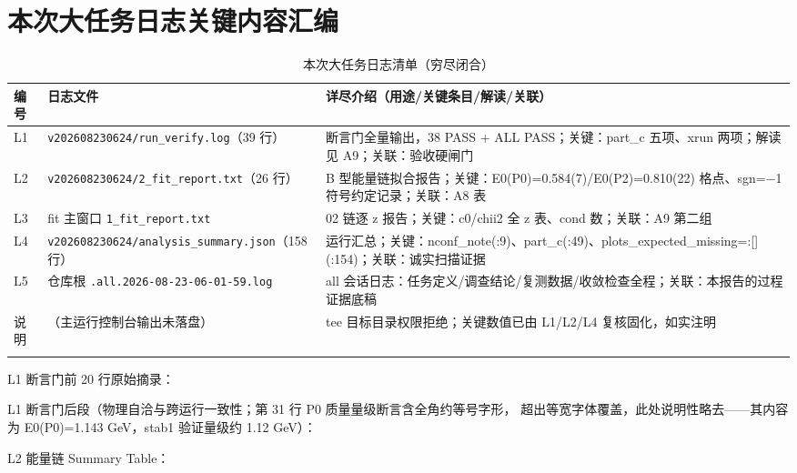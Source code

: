 \documentclass[UTF8]{ctexart}
\begin{document}
\section{本次大任务日志关键内容汇编}

\begin{xltabular}{\textwidth}{llX}
\toprule
编号 & 日志文件 & 详尽介绍（用途/关键条目/解读/关联） \\
\midrule
\endhead
L1 & \texttt{\nolinkurl{v202608230624/run\_verify.log}}（39 行） & 断言门全量输出，38 PASS + ALL PASS；关键：part\_c 五项、xrun 两项；解读见 A9；关联：验收硬闸门 \\
L2 & \texttt{\nolinkurl{v202608230624/2\_fit\_report.txt}}（26 行） & B 型能量链拟合报告；关键：E0(P0)=0.584(7)/E0(P2)=0.810(22) 格点、sgn=$-$1 符号约定记录；关联：A8 表 \\
L3 & fit 主窗口 \texttt{\nolinkurl{1\_fit\_report.txt}} & 02 链逐 z 报告；关键：c0/chii2 全 z 表、cond 数；关联：A9 第二组 \\
L4 & \texttt{\nolinkurl{v202608230624/analysis\_summary.json}}（158 行） & 运行汇总；关键：nconf\_note(:9)、part\_c(:49)、plots\_expected\_missing=:[](:154)；关联：诚实扫描证据 \\
L5 & 仓库根 \texttt{\nolinkurl{.all.2026-08-23-06-01-59.log}} & all 会话日志：任务定义/调查结论/复测数据/收敛检查全程；关联：本报告的过程证据底稿 \\
说明 & （主运行控制台输出未落盘） & tee 目标目录权限拒绝；关键数值已由 L1/L2/L4 复核固化，如实注明 \\
\bottomrule
\caption{本次大任务日志清单（穷尽闭合）}
\end{xltabular}

L1 断言门前 20 行原始摘录：


L1 断言门后段（物理自洽与跨运行一致性；第 31 行 P0 质量量级断言含全角约等号字形，
超出等宽字体覆盖，此处说明性略去——其内容为 E0(P0)=1.143 GeV，stab1 验证量级约 1.12 GeV）：


L2 能量链 Summary Table：


\end{document}
